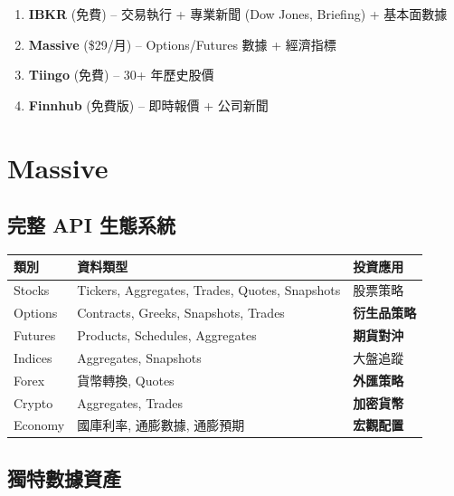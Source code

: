 \documentclass[11pt,a4paper]{article}
\begin{document}
\begin{tcolorbox}[colback=successgreen!5,colframe=successgreen,title={\textbf{推薦組合}}]
\begin{enumerate}[leftmargin=*]
    \item \textbf{IBKR} (免費) -- 交易執行 + 專業新聞 (Dow Jones, Briefing) + 基本面數據
    \item \textbf{Massive} (\$29/月) -- Options/Futures 數據 + 經濟指標
    \item \textbf{Tiingo} (免費) -- 30+ 年歷史股價
    \item \textbf{Finnhub} (免費版) -- 即時報價 + 公司新聞
\end{enumerate}
\end{tcolorbox}

\newpage
\section{Massive}

\subsection{完整 API 生態系統}

\begin{table}[H]
\centering
\begin{tabular}{@{}lll@{}}
\toprule
\textbf{類別} & \textbf{資料類型} & \textbf{投資應用} \\
\midrule
Stocks & Tickers, Aggregates, Trades, Quotes, Snapshots & 股票策略 \\
Options & Contracts, Greeks, Snapshots, Trades & \textbf{衍生品策略} \\
Futures & Products, Schedules, Aggregates & \textbf{期貨對沖} \\
Indices & Aggregates, Snapshots & 大盤追蹤 \\
Forex & 貨幣轉換, Quotes & \textbf{外匯策略} \\
Crypto & Aggregates, Trades & \textbf{加密貨幣} \\
Economy & 國庫利率, 通膨數據, 通膨預期 & \textbf{宏觀配置} \\
\bottomrule
\end{tabular}
\end{table}

\subsection{獨特數據資產}
\end{document}
